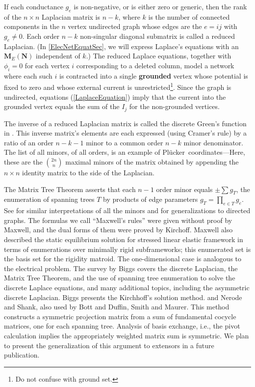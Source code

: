 \documentclass[12pt]{article}
\theoremstyle{definition}
\newcommand{\ext}[1]{\ensuremath{\mathbf{#1}}}
\newcommand{\Plucker}{Pl\"{u}cker\ }
\begin{document}
If each  conductance $g_{e}$ is non-negative, 
or is either zero
or generic, then the rank of 
the $n\times n$ Laplacian matrix is $n-k$, 
where $k$ is the number of connected components in the $n$
vertex undirected graph whose edges
are the $e=ij$ with $g_{e}\neq 0$.  Each order $n-k$ non-singular
diagonal submatrix is called a reduced Laplacian.  
(In \textsection \ref{ElecNetEquatSec}, we will express Laplace's equations
with an $\ext{M}_E(\ext{N})$ independent of $k$.) 
The reduced Laplace 
equations, together with $\phi_i=0$ for each vertex $i$ corresponding
to a deleted column, model a network where each such $i$ is 
contracted into a single 
\textbf{grounded} vertex
whose potential is fixed to zero and whose 
external current is 
unrestricted\footnote{Do not confuse with ground set.}.  
Since the graph is undirected, equations (\ref{LaplaceEquation})
imply that the current into the grounded vertex equals
the sum of the $I_j$ for the non-grounded vertices.

The inverse of a reduced Laplacian matrix is called the
discrete Green's function in \cite{ChungYaoGreens}.
This inverse matrix's elements are each expressed (using Cramer's rule)
by a ratio of an order $n-k-1$ minor to a common order $n-k$ minor
denominator.
The %
list of all minors, of all orders,
is an example of \Plucker coordinates---Here, these are the 
$\binom{2n}{n}$ maximal minors of the matrix obtained by appending
the $n\times n$ identity matrix to the side of the Laplacian.

The Matrix Tree Theorem asserts that each $n-1$ order minor 
equals $\pm\sum g_T$, the enumeration of spanning trees $T$ by products
of edge parameters $g_T=\prod_{e \in T}g_e$.  
See \cite{sdcMTT} for 
similar interpretations of all the minors and 
for generalizations to directed graphs.
The formulas we call ``Maxwell's rules'' were given without
proof by Maxwell\cite{MaxR}, and the dual forms of them were proved
by Kirchoff\cite{Kirchhoff}.
Maxwell also described the static equilibrium solution for 
stressed linear elastic
framework in terms of enumerations over minimally rigid 
subframeworks\cite{MaxwellsFramesPaper}; this enumerated set is the basis
set for the rigidity matroid\cite{RigidityBook}.  The one-dimensional case
is analogous to the electrical problem.
The survey by Biggs \cite{BiggsAlgPotTheory}
covers the discrete Laplacian, the Matrix Tree Theorem, and the
use of spanning tree enumeration to solve the discrete Laplace equations, and
many additional topics, including the asymmetric discrete Laplacian.
Biggs presents the Kirchhoff's solution method.
and Nerode and Shank\cite{NerodeShank}, also used by 
Bott and Duffin\cite{BottDuffinAlgNetworks}, Smith\cite{SmithElec}
and Maurer\cite{Maurer76}.
This method constructs a symmetric projection matrix from a sum of fundamental
cocycle matrices, one for each spanning tree.  Analysis of basis exchange,
i.e., the pivot calculation
implies the appropriately weighted matrix sum is symmetric.  We plan to present
the generalization of this argument to extensors in a future publication.
\end{document}
